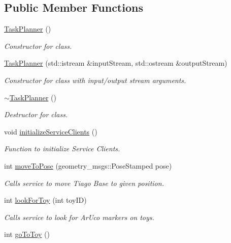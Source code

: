 \subsection*{Public Member Functions}
\begin{DoxyCompactItemize}
\item 
\hyperlink{classTaskPlanner_a63d11be6cf3d676ef3256ab4019537b7}{Task\+Planner} ()
\begin{DoxyCompactList}\small\item\em Constructor for class. \end{DoxyCompactList}\item 
\hyperlink{classTaskPlanner_a39b6eab2a22f8249d046330e833571df}{Task\+Planner} (std\+::istream \&input\+Stream, std\+::ostream \&output\+Stream)
\begin{DoxyCompactList}\small\item\em Constructor for class with input/output stream arguments. \end{DoxyCompactList}\item 
\hyperlink{classTaskPlanner_a551378501f7a1e6304c207c25b2400db}{$\sim$\+Task\+Planner} ()
\begin{DoxyCompactList}\small\item\em Destructor for class. \end{DoxyCompactList}\item 
void \hyperlink{classTaskPlanner_a6347f18c5b24392c58d4ff87ff7f256c}{initialize\+Service\+Clients} ()
\begin{DoxyCompactList}\small\item\em Function to initialize Service Clients. \end{DoxyCompactList}\item 
int \hyperlink{classTaskPlanner_a0a9c473acb9493472dca65bb9e17eede}{move\+To\+Pose} (geometry\+\_\+msgs\+::\+Pose\+Stamped pose)
\begin{DoxyCompactList}\small\item\em Calls service to move Tiago Base to given position. \end{DoxyCompactList}\item 
int \hyperlink{classTaskPlanner_aa2522c94c2269b1abbf8a811b5a98456}{look\+For\+Toy} (int toy\+ID)
\begin{DoxyCompactList}\small\item\em Calls service to look for Ar\+Uco markers on toys. \end{DoxyCompactList}\item 
int \hyperlink{classTaskPlanner_ab618ec1d38428184f939b0a661068ea5}{go\+To\+Toy} ()

\end{DoxyCompactItemize}
